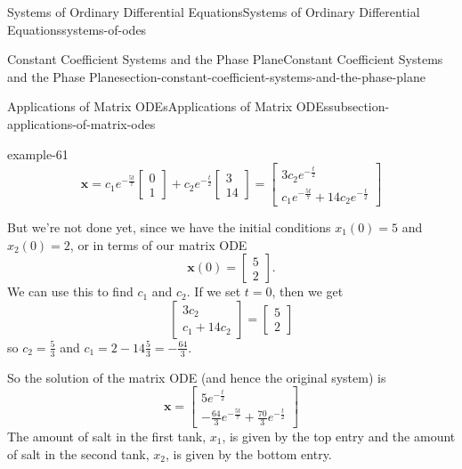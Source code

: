 \documentclass[oneside,10pt,]{book}
\numberwithin{equation}{section}
\renewcommand{\vec}[1]{\mathbf{#1}}
\begin{document}
\begin{chapterptx}{Systems of Ordinary Differential Equations}{}{Systems of Ordinary Differential Equations}{}{}{systems-of-odes}
\begin{sectionptx}{Constant Coefficient Systems and the Phase Plane}{}{Constant Coefficient Systems and the Phase Plane}{}{}{section-constant-coefficient-systems-and-the-phase-plane}
\begin{subsectionptx}{Applications of Matrix ODEs}{}{Applications of Matrix ODEs}{}{}{subsection-applications-of-matrix-odes}
\begin{example}{}{example-61}
\begin{equation*}
\vec{x} = c_{1}e^{-\frac{5t}{7}}\begin{bmatrix}0\\1\end{bmatrix} + c_{2}e^{-\frac{t}{2}}\begin{bmatrix}3\\14\end{bmatrix} = \begin{bmatrix}3c_{2}e^{-\frac{t}{2}} \\ c_{1}e^{-\frac{5t}{7}}+14c_{2}e^{-\frac{t}{2}}\end{bmatrix}
\end{equation*}
%
\par
\hypertarget{p-365}{}%
But we're not done yet, since we have the initial conditions \(x_{1}(0) = 5\) and \(x_{2}(0) = 2\), or in terms of our matrix ODE%
\begin{equation*}
\vec{x}(0) = \begin{bmatrix}5\\2\end{bmatrix}.
\end{equation*}
We can use this to find \(c_{1}\) and \(c_{2}\). If we set \(t=0\), then we get%
\begin{equation*}
\begin{bmatrix}3c_{2} \\ c_{1} + 14c_{2}\end{bmatrix} = \begin{bmatrix}5\\2\end{bmatrix}
\end{equation*}
so \(c_{2} = \frac{5}{3}\) and \(c_{1} = 2 - 14\frac{5}{3} = -\frac{64}{3}\).%
\par
\hypertarget{p-366}{}%
So the solution of the matrix ODE (and hence the original system) is%
\begin{equation*}
\vec{x} = \begin{bmatrix}5e^{-\frac{t}{2}} \\ -\frac{64}{3}e^{-\frac{5t}{7}}+\frac{70}{3}e^{-\frac{t}{2}}\end{bmatrix}
\end{equation*}
The amount of salt in the first tank, \(x_{1}\), is given by the top entry and the amount of salt in the second tank, \(x_{2}\), is given by the bottom entry.%
\end{example}
\end{subsectionptx}
%
%
\typeout{************************************************}
\typeout{************************************************}

\end{sectionptx}
\end{chapterptx}
\end{document}
